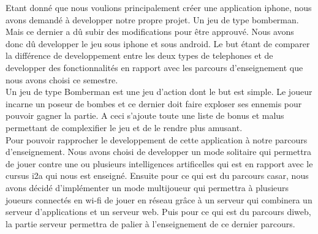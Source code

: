 
 Etant donné que nous voulions principalement créer une application \gls{iphone}, nous avons demandé à developper notre propre projet. Un jeu de type bomberman. Mais ce dernier a dû subir des modifications pour être approuvé. Nous avons donc dû developper le jeu sous \gls{iphone} et sous  \gls{android}. Le but étant de comparer la différence de developpement entre les deux types de telephones et de developper des fonctionnalités en rapport avec les parcours d'enseignement que nous avons choisi ce semestre.\\
	
Un jeu de type Bomberman est une jeu d'action dont le but est simple. Le joueur incarne un poseur de bombes et ce dernier doit faire exploser ses ennemis pour pouvoir gagner la partie. A ceci s'ajoute toute une liste de bonus et malus permettant de complexifier le jeu et de le rendre plus amusant.\\
	
Pour pouvoir rapprocher le developpement de cette application à notre parcours d'enseignement. Nous avons choisi de developper un mode solitaire qui permettra de jouer contre une ou plusieurs intelligences artificelles qui est en rapport avec le cursus \gls{i2a} qui nous est enseigné. Ensuite pour ce qui est du parcours \gls{casar}, nous avons décidé d'implémenter un mode multijoueur qui permettra à plusieurs joueurs connectés en \gls{wi-fi} de jouer en réseau grâce à un serveur qui combinera un serveur d'applications et un serveur web. Puis pour ce qui est du parcours \gls{diweb}, la partie serveur permettra de palier à l'enseignement de ce dernier parcours.
	
	

		
